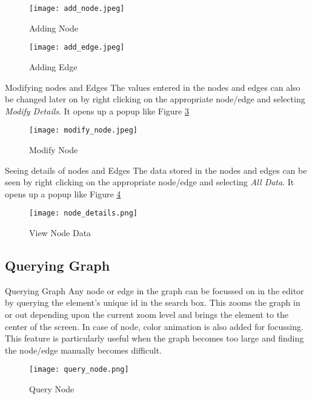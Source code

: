 \documentclass{beamer}
\begin{document}
\begin{frame}
\begin{figure}
\centering
\texttt{[image: add\_node.jpeg]}
\label{fig:add_node}
\caption{Adding Node}
\end{figure}
\end{frame}

\begin{frame}
\begin{figure}
\centering
\texttt{[image: add\_edge.jpeg]}
\label{fig:add_edge}
\caption{Adding Edge}
\end{figure}
\end{frame}

\begin{frame}{Modifying nodes and Edges}
The values entered in the nodes and edges can also be changed later on by right clicking on the appropriate node/edge and selecting \emph{Modify Details}. It opens up a popup like Figure \ref{fig:modify_node}

\begin{figure}
\centering
\texttt{[image: modify\_node.jpeg]}
\label{fig:modify_node}
\caption{Modify Node}
\end{figure}

\end{frame}

\begin{frame}{Seeing details of nodes and Edges}
The data stored in the nodes and edges can be seen by right clicking on the appropriate node/edge and selecting \emph{All Data}. It opens up a popup like Figure \ref{fig:node_details}

\begin{figure}
\centering
\texttt{[image: node\_details.png]}
\label{fig:node_details}
\caption{View Node Data}
\end{figure}

\end{frame}

\subsection{Querying Graph}
\begin{frame}{Querying Graph}
Any node or edge in the graph can be focussed on in the editor by querying the element's unique id in the search box. This zooms the graph in or out depending upon the current zoom level and brings the element to the center of the screen. In case of node, color animation is also added for focussing. This feature is particularly useful when the graph becomes too large and finding the node/edge manually becomes difficult.
\begin{figure}
\centering
\texttt{[image: query\_node.png]}
\label{fig:query_node}
\caption{Query Node}
\end{figure}

\end{frame}
\end{document}

